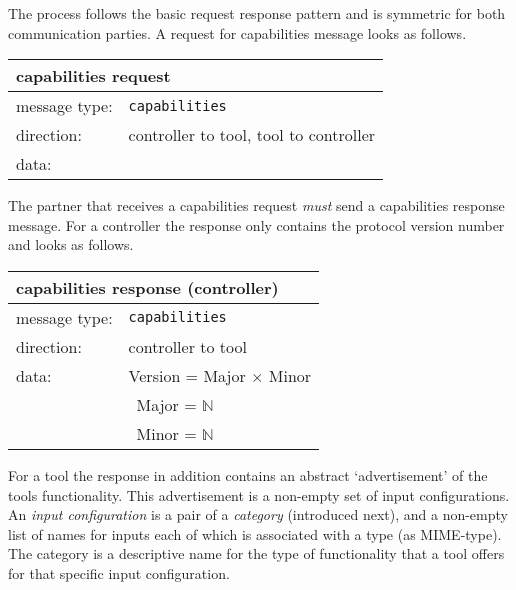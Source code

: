 \documentclass{article}
\newcommand{\msg}[1]{\texttt{#1}}
\begin{document}
   \noindent The process follows the basic request response pattern and is
   symmetric for both communication parties. A request for capabilities
   message looks as follows.
   
   \begin{table}[H]
    \begin{center}
     \begin{tabular}{|ll|}
      \hline
       \multicolumn{2}{|l|}{\textbf{capabilities request}} \\
      \hline
       message type:    & \msg{capabilities} \\
      \hline
       direction:       & controller to tool, tool to controller \\
       data:            & \\
      \hline
     \end{tabular}
     \vspace{-0.3cm}
    \end{center}
   \end{table}

   \noindent The partner that receives a capabilities request \emph{must} send
   a capabilities response message. For a controller the response only contains
   the protocol version number and looks as follows.

   \begin{table}[H]
    \begin{center}
     \begin{tabular}{|ll|}
      \hline
       \multicolumn{2}{|l|}{\textbf{capabilities response (controller)}} \\
      \hline
       message type:   & \msg{capabilities} \\
      \hline
       direction:      & controller to tool \\
       data:           & Version = Major $\times$ Minor \\
                       & \ Major = $\mathbb{N}$ \\
                       & \ Minor = $\mathbb{N}$ \\
      \hline
     \end{tabular}
    \end{center}
    \vspace{-0.3cm}
   \end{table}

   \noindent For a tool the response in addition contains an abstract
   `advertisement' of the tools functionality. This advertisement is a
   non-empty set of input configurations.  An \textit{input configuration} is a
   pair of a \textit{category} (introduced next), and a non-empty list of names
   for inputs each of which is associated with a type (as MIME-type).  The
   category is a descriptive name for the type of functionality that a tool
   offers for that specific input configuration.
   
\end{document}
